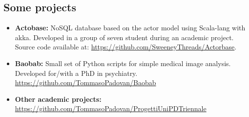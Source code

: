\documentclass[letterpaper]{twentysecondcv} %
\begin{document}
\subsection{Some projects}
\small
\begin{itemize}[noitemsep,nolistsep]
	\item \textbf{Actobase:} NoSQL database based on the actor model using Scala-lang with akka. Developed in a group of seven student during an academic project. Source code available at: \url{https://github.com/SweeneyThreads/Actorbase}.
	\item \textbf{Baobab:} Small set of Python scripts for simple medical image analysis. Developed for/with a PhD in psychiatry. \url{https://github.com/TommasoPadovan/Baobab}
	\item \textbf{Other academic projects:} \\\url{https://github.com/TommasoPadovan/ProgettiUniPDTriennale}
\end{itemize}

\tiny
{}






\end{document}
